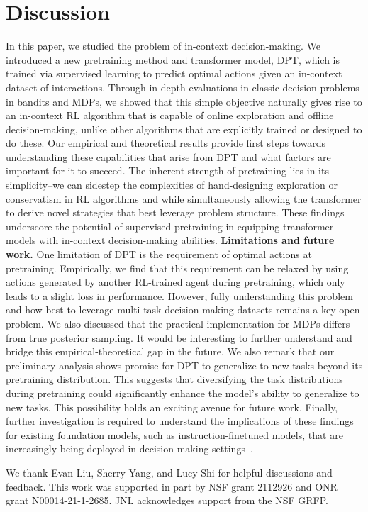 \documentclass{article}
\newcommand{\macroName}{DPT}
\begin{document}
\section{Discussion}
In this paper, we studied the problem of in-context decision-making. We introduced a new pretraining method and transformer model,  \macroName{}, which is trained via supervised learning to predict optimal actions given an in-context dataset of interactions. Through in-depth evaluations in classic decision problems in bandits and MDPs, we showed that this simple objective naturally gives rise to an in-context RL algorithm that is capable of online exploration and offline decision-making, unlike other algorithms that are explicitly trained or designed to do these. Our empirical and theoretical results provide first steps towards understanding these capabilities that arise from DPT and what factors are important for it to succeed.
The inherent strength of pretraining lies in its simplicity--we can sidestep the complexities of hand-designing exploration or conservatism in RL algorithms and while simultaneously allowing the transformer to derive novel strategies that best leverage problem structure.
These findings underscore the potential of supervised pretraining in equipping transformer models with in-context decision-making abilities.
\textbf{Limitations and future work. }
One limitation of \macroName{} is the requirement of optimal actions at pretraining. Empirically, we find that this requirement can be relaxed by using actions generated by another RL-trained agent during pretraining, which only leads to a slight loss in performance. However, fully understanding this problem and how best to leverage multi-task decision-making datasets remains a key open problem.
We also discussed that the practical implementation for MDPs differs from true posterior sampling. It would be interesting to further understand and bridge this empirical-theoretical gap in the future.
We also remark that our preliminary analysis shows promise for DPT to generalize to new tasks beyond its pretraining distribution. This suggests that diversifying the task distributions during pretraining could significantly enhance the model's ability to generalize to new tasks. This possibility holds an exciting avenue for future work. Finally, further investigation is required to understand the implications of these findings for existing foundation models, such as instruction-finetuned models, that are increasingly being deployed in decision-making settings~\citep{wang2023voyager}.
\begin{ack}
We thank Evan Liu, Sherry Yang, and Lucy Shi for helpful discussions and feedback. This work was supported in part by NSF grant 2112926 and ONR grant N00014-21-1-2685. JNL acknowledges support from the NSF GRFP.
\end{ack}


\newpage
\appendix
\end{document}
